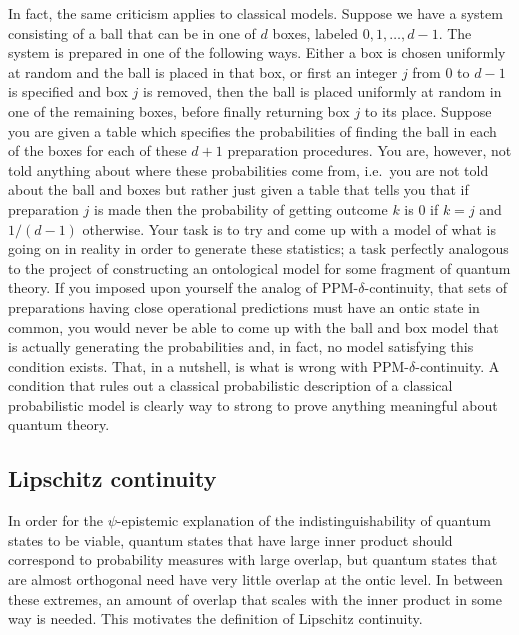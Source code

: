 \documentclass[DIV=calc,fontsize=12pt]{scrartcl} %
\theoremstyle{definition}
\theoremstyle{plain}
\begin{document}
In fact, the same criticism applies to classical models.  Suppose we
have a system consisting of a ball that can be in one of $d$ boxes,
labeled $0,1,\ldots,d-1$.  The system is prepared in one of the
following ways.  Either a box is chosen uniformly at random and the
ball is placed in that box, or first an integer $j$ from $0$ to $d-1$
is specified and box $j$ is removed, then the ball is placed uniformly
at random in one of the remaining boxes, before finally returning box
$j$ to its place.  Suppose you are given a table which specifies the
probabilities of finding the ball in each of the boxes for each of
these $d+1$ preparation procedures.  You are, however, not told
anything about where these probabilities come from, i.e.\ you are not
told about the ball and boxes but rather just given a table that tells
you that if preparation $j$ is made then the probability of getting
outcome $k$ is $0$ if $k=j$ and $1/(d-1)$ otherwise.  Your task is to
try and come up with a model of what is going on in reality in order
to generate these statistics; a task perfectly analogous to the
project of constructing an ontological model for some fragment of
quantum theory.  If you imposed upon yourself the analog of
PPM-$\delta$-continuity, that sets of preparations having close
operational predictions must have an ontic state in common, you would
never be able to come up with the ball and box model that is actually
generating the probabilities and, in fact, no model satisfying this
condition exists.  That, in a nutshell, is what is wrong with
PPM-$\delta$-continuity.  A condition that rules out a classical
probabilistic description of a classical probabilistic model is
clearly way to strong to prove anything meaningful about quantum
theory.

\subsection{Lipschitz continuity}

\label{Lips}

In order for the $\psi$-epistemic explanation of the
indistinguishability of quantum states to be viable, quantum states
that have large inner product should correspond to probability
measures with large overlap, but quantum states that are almost
orthogonal need have very little overlap at the ontic level.  In
between these extremes, an amount of overlap that scales with the
inner product in some way is needed.  This motivates the definition of
Lipschitz continuity.
\end{document}
